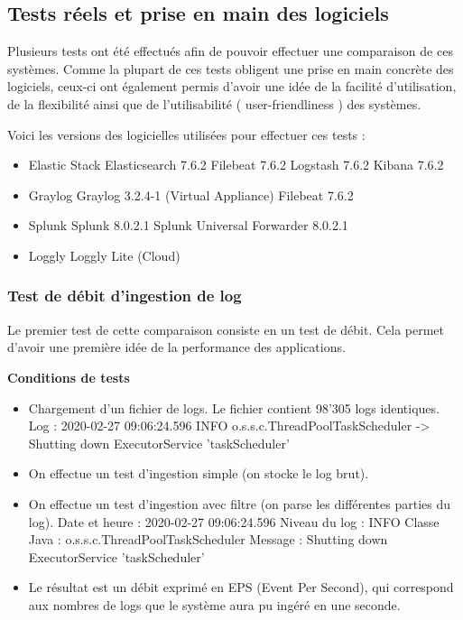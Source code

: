 \documentclass[paper=a4, fontsize=11pt]{scrartcl}
\begin{document}
\justify

\subsection{Tests réels et prise en main des logiciels}

Plusieurs tests ont été effectués afin de pouvoir effectuer une comparaison de ces systèmes. Comme la plupart de ces tests obligent une prise en main concrète des logiciels, ceux-ci ont également permis d'avoir une idée de la facilité d'utilisation, de la flexibilité ainsi que de l'utilisabilité ( \og user-friendliness \fg) des systèmes.

Voici les versions des logicielles utilisées pour effectuer ces tests :

\begin{itemize}
    \item Elastic Stack
    \subitem Elasticsearch 7.6.2
    \subitem Filebeat 7.6.2
    \subitem Logstash 7.6.2
    \subitem Kibana 7.6.2
    \item Graylog
    \subitem Graylog 3.2.4-1 (Virtual Appliance)
    \subitem Filebeat 7.6.2
    \item Splunk
    \subitem Splunk 8.0.2.1
    \subitem Splunk Universal Forwarder 8.0.2.1
    \item Loggly
    \subitem Loggly Lite (Cloud)
\end{itemize}

\subsubsection{Test de débit d'ingestion de log}

Le premier test de cette comparaison consiste en un test de débit. Cela permet d'avoir une première idée de la performance des applications.

\textbf{Conditions de tests} \\
\begin{itemize}
    \item Chargement d'un fichier de logs.
    \subitem Le fichier contient 98'305 logs identiques.
    \subitem Log : 2020-02-27 09:06:24.596 INFO  o.s.s.c.ThreadPoolTaskScheduler -> Shutting down ExecutorService 'taskScheduler'
    \item On effectue un test d'ingestion simple (on stocke le log brut).
    \item On effectue un test d'ingestion avec filtre (on parse les différentes parties du log).
    \subitem Date et heure : 2020-02-27 09:06:24.596
    \subitem Niveau du log : INFO
    \subitem Classe Java : o.s.s.c.ThreadPoolTaskScheduler
    \subitem Message : Shutting down ExecutorService 'taskScheduler'
    \item Le résultat est un débit exprimé en EPS (Event Per Second), qui correspond aux nombres de logs que le système aura pu ingéré en une seconde.
\end{itemize}
\end{document}
